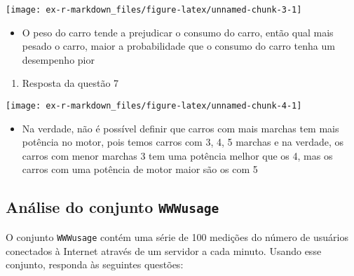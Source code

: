 \documentclass[
]{article}
\newenvironment{Shaded}{\begin{snugshade}}{\end{snugshade}}
\newcommand{\AttributeTok}[1]{\textcolor[rgb]{0.77,0.63,0.00}{#1}}
\newcommand{\DecValTok}[1]{\textcolor[rgb]{0.00,0.00,0.81}{#1}}
\newcommand{\FunctionTok}[1]{\textcolor[rgb]{0.00,0.00,0.00}{#1}}
\newcommand{\NormalTok}[1]{#1}
\newcommand{\SpecialCharTok}[1]{\textcolor[rgb]{0.00,0.00,0.00}{#1}}
\newcommand{\StringTok}[1]{\textcolor[rgb]{0.31,0.60,0.02}{#1}}
\providecommand{\tightlist}{%
  \setlength{\itemsep}{0pt}\setlength{\parskip}{0pt}}
\begin{document}
\begin{center}\texttt{[image: ex-r-markdown\_files/figure-latex/unnamed-chunk-3-1]} \end{center}

\begin{itemize}
\tightlist
\item
  O peso do carro tende a prejudicar o consumo do carro, então qual mais
  pesado o carro, maior a probabilidade que o consumo do carro tenha um
  desempenho pior
\end{itemize}

\begin{enumerate}
\def\labelenumi{\arabic{enumi}.}
\setcounter{enumi}{6}
\tightlist
\item
  Resposta da questão 7
\end{enumerate}

\begin{Shaded}
\end{Shaded}

\begin{center}\texttt{[image: ex-r-markdown\_files/figure-latex/unnamed-chunk-4-1]} \end{center}

\begin{itemize}
\tightlist
\item
  Na verdade, não é possível definir que carros com mais marchas tem
  mais potência no motor, pois temos carros com 3, 4, 5 marchas e na
  verdade, os carros com menor marchas 3 tem uma potência melhor que os
  4, mas os carros com uma potência de motor maior são os com 5
\end{itemize}

\hypertarget{anuxe1lise-do-conjunto-wwwusage}{%
\subsection{\texorpdfstring{Análise do conjunto
\texttt{WWWusage}}{Análise do conjunto WWWusage}}\label{anuxe1lise-do-conjunto-wwwusage}}

O conjunto \texttt{WWWusage} contém uma série de 100 medições do número
de usuários conectados à Internet através de um servidor a cada minuto.
Usando esse conjunto, responda às seguintes questões:
\end{document}
